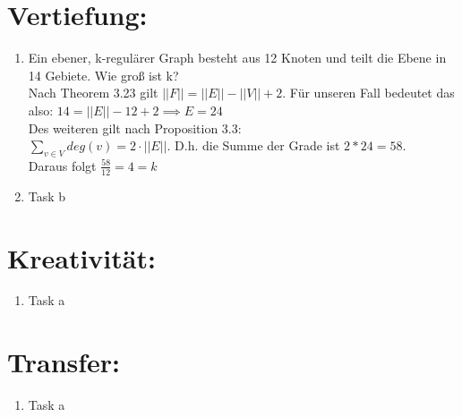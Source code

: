 



    \maketitle
    \section*{Vertiefung:}
    \begin{enumerate}[label=(\alph*)]
        \item  Ein ebener,
        k-regulärer Graph besteht aus
        12 Knoten und teilt die Ebene in
        14 Gebiete. Wie groß ist k? \\
        Nach Theorem 3.23 gilt $||F|| = ||E|| - ||V|| + 2$. Für unseren Fall bedeutet das also:
        $14 = ||E|| - 12 + 2 \implies E = 24$ \\
        Des weiteren gilt nach Proposition 3.3: \\
        $\sum_{v \in V} deg(v) = 2 \cdot ||E||$. D.h. die Summe der Grade ist $2 * 24 = 58$. \\
        Daraus folgt $\frac{58}{12} = 4 = k$
        
        \item Task b
    \end{enumerate}
    \section*{Kreativität:}
    \begin{enumerate}[label=(\alph*)]
    	\item Task a
    \end{enumerate}
    \section*{Transfer:}
    \begin{enumerate}[label=(\alph*)]
    	\item Task a
    \end{enumerate}







